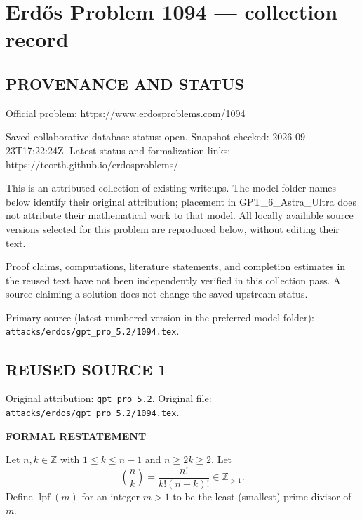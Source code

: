 \section*{Erd\H{o}s Problem 1094 --- collection record}

\subsection*{PROVENANCE AND STATUS}
Official problem: https://www.erdosproblems.com/1094

Saved collaborative-database status: open.
Snapshot checked: 2026-09-23T17:22:24Z.
Latest status and formalization links: https://teorth.github.io/erdosproblems/

This is an attributed collection of existing writeups. The model-folder names below identify their original attribution; placement in GPT\_6\_Astra\_Ultra does not attribute their mathematical work to that model. All locally available source versions selected for this problem are reproduced below, without editing their text.

Proof claims, computations, literature statements, and completion estimates in the reused text have not been independently verified in this collection pass. A source claiming a solution does not change the saved upstream status.

Primary source (latest numbered version in the preferred model folder): \texttt{attacks/erdos/gpt\_pro\_5.2/1094.tex}.

\subsection*{REUSED SOURCE 1}
Original attribution: \texttt{gpt\_pro\_5.2}.
Original file: \texttt{attacks/erdos/gpt\_pro\_5.2/1094.tex}.



\medskip
\noindent\textbf{FORMAL RESTATEMENT}

\smallskip
\noindent
Let $n,k\in\mathbb{Z}$ with $1\le k\le n-1$ and $n\ge 2k\ge 2$. Let
\[
\binom{n}{k}=\frac{n!}{k!(n-k)!}\in\mathbb{Z}_{>1}.
\]
Define $\operatorname{lpf}(m)$ for an integer $m>1$ to be the least (smallest) prime divisor of $m$.

